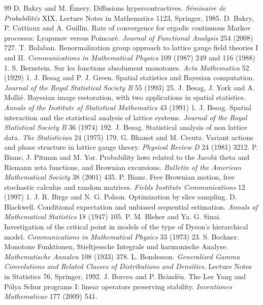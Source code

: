 \begin{thebibliography}{99}
 D. Bakry and M. \'Emery. Diffusions hypercontractives. \emph{S\'eminaire de Probabilit\'es} XIX, Lecture Notes in Mathematics 1123, Springer, 1985.
 D. Bakry, P. Cattiaux and A. Guillin. Rate of convergence for ergodic continuous Markov processes: Lyapunov versus Poincar\'e. \emph{Journal of Functional Analysis} 254 (2008) 727.
 T. Ba\l aban. Renormalization group approach to lattice gauge field theories I and II. \emph{Communications in Mathematical Physics} 109 (1987) 249 and 116 (1988) 1.
 S. Bernstein. Sur les fonctions absolument monotones. \emph{Acta Mathematica} 52 (1929) 1.
 J. Besag and P. J. Green. Spatial statistics and Bayesian computation. \emph{Journal of the Royal Statistical Society B} 55 (1993) 25.
 J. Besag, J. York and A. Molli\'e. Bayesian image restoration, with two applications in spatial statistics. \emph{Annals of the Institute of Statistical Mathematics} 43 (1991) 1.
 J. Besag. Spatial interaction and the statistical analysis of lattice systems. \emph{Journal of the Royal Statistical Society B} 36 (1974) 192.
 J. Besag. Statistical analysis of non lattice data. \emph{The Statistician} 24 (1975) 179.
 G. Bhanot and M. Creutz. Variant actions and phase structure in lattice gauge theory. \emph{Physical Review D} 24 (1981) 3212.
 P. Biane, J. Pitman and M. Yor. Probability laws related to the Jacobi theta and Riemann zeta functions, and Brownian excursions. \emph{Bulletin of the American Mathematical Society} 38 (2001) 435.
 P. Biane. Free Brownian motion, free stochastic calculus and random matrices. \emph{Fields Institute Communications} 12 (1997) 1.
 J. R. Birge and N. G. Polson. Optimization by slice sampling.
 D. Blackwell. Conditional expectation and unbiased sequential estimation. \emph{Annals of Mathematical Statistics} 18 (1947) 105.
 P. M. Bleher and Ya. G. Sinai. Investigation of the critical point in models of the type of Dyson's hierarchical model. \emph{Communications in Mathematical Physics} 33 (1973) 23.
 S. Bochner. Monotone Funktionen, Stieltjessche Integrale und harmonische Analyse. \emph{Mathematische Annalen} 108 (1933) 378.
 L. Bondesson. \emph{Generalized Gamma Convolutions and Related Classes of Distributions and Densities}. Lecture Notes in Statistics 76, Springer, 1992.
 J. Borcea and P. Br\"and\'en. The Lee Yang and P\'olya Schur programs I: linear operators preserving stability. \emph{Inventiones Mathematicae} 177 (2009) 541.

\end{thebibliography}
